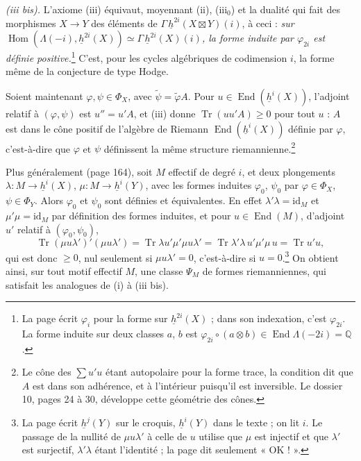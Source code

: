 \documentclass[11pt,a4paper]{article}
\begin{document}
\emph{(iii bis).} L'axiome (iii) équivaut, moyennant (ii), (iii$_{0}$) et la dualité
qui fait des morphismes $X \to Y$ des éléments de $\Gamma\,\underline{h}^{2i}(X
\boxtimes Y)(i)$, à ceci : \emph{sur $\operatorname{Hom}(\Lambda(-i),
\underline{h}^{2i}(X)) \simeq \Gamma\,\underline{h}^{2i}(X)(i)$, la forme induite par
$\varphi_{2i}$ est définie positive.}\footnote{La page écrit $\varphi_{i}$ pour la
forme sur $\underline{h}^{2i}(X)$ ; dans son indexation, c'est $\varphi_{2i}$. La
forme induite sur deux classes $a$, $b$ est $\varphi_{2i} \circ (a \otimes b) \in
\operatorname{End}\Lambda(-2i) = \mathbb{Q}$.} C'est, pour les cycles algébriques de
codimension $i$, la forme même de la conjecture de type Hodge.

Soient maintenant $\varphi, \psi \in \Phi_{X}$, avec $\tilde{\psi} = \tilde{\varphi} A$.
Pour $u \in \operatorname{End}(\underline{h}^{i}(X))$, l'adjoint relatif à $(\varphi,
\psi)$ est $u'' = u'A$, et (iii) donne $\operatorname{Tr}(u u' A) \geqslant 0$ pour
tout $u$ : $A$ est dans le cône positif de l'algèbre de Riemann
$\operatorname{End}(\underline{h}^{i}(X))$ définie par $\varphi$, c'est-à-dire que
$\varphi$ et $\psi$ définissent la même structure riemannienne.\footnote{Le cône des
$\sum u'u$ étant autopolaire pour la forme trace, la condition dit que $A$ est dans
son adhérence, et à l'intérieur puisqu'il est inversible. Le dossier 10, pages 24 à
30, développe cette géométrie des cônes.}

Plus généralement (page 164), soit $M$ effectif de degré $i$, et deux plongements
$\lambda \colon M \to \underline{h}^{i}(X)$, $\mu \colon M \to \underline{h}^{i}(Y)$,
avec les formes induites $\varphi_{0}$, $\psi_{0}$ par $\varphi \in \Phi_{X}$, $\psi \in
\Phi_{Y}$. Alors $\varphi_{0}$ et $\psi_{0}$ sont définies et équivalentes. En effet
$\lambda'\lambda = \mathrm{id}_{M}$ et $\mu'\mu = \mathrm{id}_{M}$ par définition des
formes induites, et pour $u \in \operatorname{End}(M)$, d'adjoint $u'$ relatif à
$(\varphi_{0}, \psi_{0})$,
\[
\operatorname{Tr}(\mu u \lambda')'(\mu u \lambda') =
\operatorname{Tr}\lambda u' \mu' \mu u \lambda' =
\operatorname{Tr}\lambda'\lambda\, u' \mu'\mu\, u = \operatorname{Tr} u'u ,
\]
qui est donc $\geqslant 0$, nul seulement si $\mu u \lambda' = 0$, c'est-à-dire si $u =
0$.\footnote{La page écrit $\underline{h}^{j}(Y)$ sur le croquis, $\underline{h}^{i}(Y)$
dans le texte ; on lit $i$. Le passage de la nullité de $\mu u \lambda'$ à celle de
$u$ utilise que $\mu$ est injectif et que $\lambda'$ est surjectif, $\lambda'\lambda$
étant l'identité ; la page dit seulement « OK ! ».} On obtient ainsi, sur tout motif
effectif $M$, une classe $\Psi_{M}$ de formes riemanniennes, qui satisfait les
analogues de (i) à (iii bis).
\end{document}
